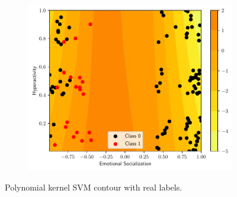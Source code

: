 \begin{figure}
\begin{subfigure}[b]{0.32\textwidth}
        \includegraphics[width=\textwidth]{figs/svm-poly-contour-2-5.pdf}
        \caption{}
    \end{subfigure}
    \caption{Polynomial kernel SVM contour with real labels.}
    \label{fig:SVM-poly}
\end{figure}

